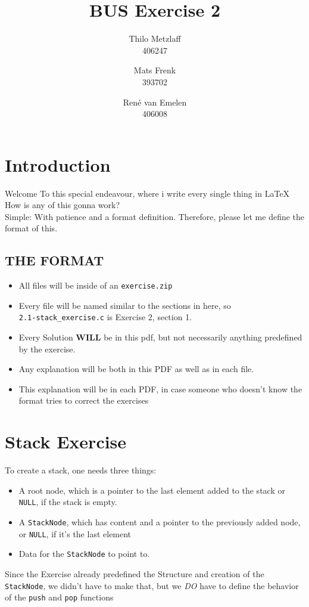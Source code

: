 \documentclass[a4paper, 11pt]{article}
\author{Thilo Metzlaff\\406247 \and Mats Frenk\\393702\and René van Emelen\\406008}
\title{BUS Exercise 2}
\begin{document}
    \maketitle
    \newpage

    \tableofcontents
    \newpage

    \section{Introduction}
    Welcome To this special endeavour, where i write every single thing in \LaTeX{}
    How is any of this gonna work?\\
    Simple: With patience and a format definition. Therefore, please let me define the format of this.

    \subsection*{THE FORMAT}
    \begin{itemize}
        \item All files will be inside of an \texttt{exercise.zip}
        \item Every file will be named similar to the sections in here, so\\
              \texttt{2.1-stack\_exercise.c} is Exercise 2, section 1.
        \item Every Solution \textbf{WILL} be in this pdf, but not necessarily 
              anything predefined by the exercise.
        \item Any explanation will be both in this PDF as well as in each file.
        \item This explanation will be in each PDF, in case someone who doesn't
              know the format tries to correct the exercises
    \end{itemize}
    \newpage

    \section{Stack Exercise}
    To create a stack, one needs three things:
    \begin{itemize}
        \item A root node, which is a pointer to the last element added
              to the stack or \texttt{NULL}, if the stack is empty.
        \item A \texttt{StackNode}, which has content and a pointer to the previously 
              added node, or \texttt{NULL}, if it's the last element
        \item Data for the \texttt{StackNode} to point to.
    \end{itemize}
    Since the Exercise already predefined the Structure and creation of the \texttt{StackNode}, 
    we didn't have to make that, but we \emph{DO} have to define the behavior of the \texttt{push} and
    \texttt{pop} functions
\end{document}
